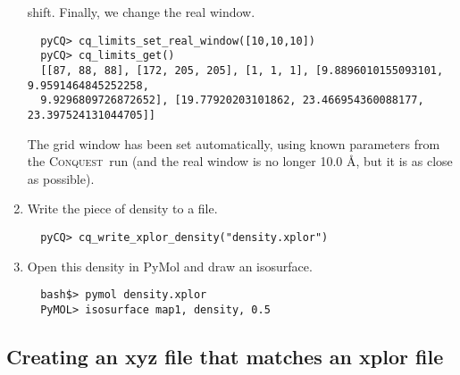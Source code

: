 \documentclass[a4paper,notitlepage,11pt]{article}
\def\CQ{\textsc{Conquest}}
\begin{document}
\begin{enumerate}
  shift. Finally, we change the real window. 
{\scriptsize
  \begin{verbatim}
  pyCQ> cq_limits_set_real_window([10,10,10])
  pyCQ> cq_limits_get()
  [[87, 88, 88], [172, 205, 205], [1, 1, 1], [9.8896010155093101, 9.9591464845252258, 
  9.9296809726872652], [19.77920203101862, 23.466954360088177, 23.397524131044705]]
    \end{verbatim}
  }
  The grid window has been set automatically, using known parameters from the \CQ\ run (and the real window is no longer 10.0
  \AA, but it is as close as possible).
  \item Write the piece of density to a file.
{\scriptsize
  \begin{verbatim}
  pyCQ> cq_write_xplor_density("density.xplor")
  \end{verbatim}
  }
  \item Open this density in PyMol and draw an isosurface.
{\scriptsize
  \begin{verbatim}
  bash$> pymol density.xplor
  PyMOL> isosurface map1, density, 0.5
  \end{verbatim}
  }
\end{enumerate}

\subsection{Creating an xyz file that matches an xplor file}
\label{sec:making-xyz-match}
\end{document}
